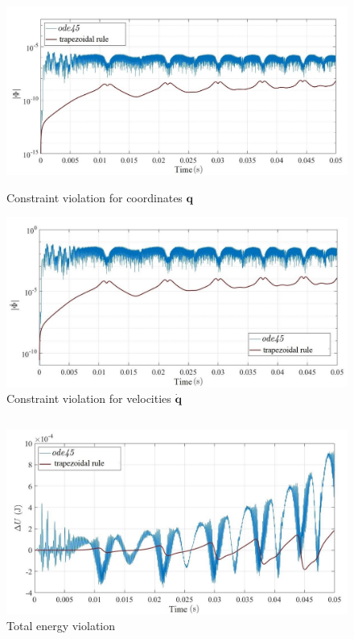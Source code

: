 \documentclass{beamer}
\newcommand{\bb}[1]{\mathbf{#1}}
\begin{document}
\begin{frame}
\begin{columns}
\begin{column}{0.425\paperwidth}
\begin{figure}
\centering
\begin{minipage}{0.5\textwidth}
  \centering
 \includegraphics[width=\textwidth]{Phi_comp_1}
\caption{Constraint violation for coordinates $\bb{q}$}
  \label{fig:test1}
\end{minipage}%
\begin{minipage}{0.5\textwidth}
  \centering
\includegraphics[width=\textwidth]{dPhi_comp_1}
\caption{Constraint violation for velocities $\bb{\dot{q}}$}
\end{minipage}
\end{figure}
\begin{columns}
\begin{column}{0.5\textwidth}
\begin{figure}
\centering
\includegraphics[width=\textwidth]{E_comp_1}
\caption{Total energy violation}
\end{figure}
\end{column}


\end{columns}
\end{column}
\end{columns}
\end{frame}
\end{document}
